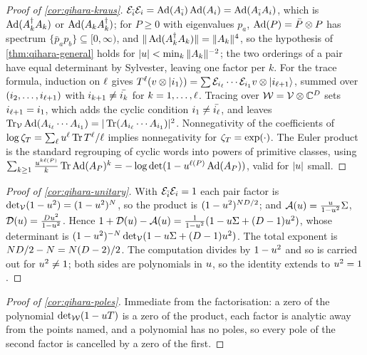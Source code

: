 \begin{proof}[Proof of \cref{cor:qihara-kraus}]
$\mathcal E_{\bar{i}}\mathcal E_{i} = \operatorname{Ad}(A_{\bar{i}})\operatorname{Ad}(A_{i}) = \operatorname{Ad}(A_{\bar{i}}A_{i})$, which is
$\operatorname{Ad}(A_{k}^\dagger A_{k})$ or $\operatorname{Ad}(A_{k}A_{k}^\dagger)$; for $P\ge0$ with eigenvalues $p_a$, $\operatorname{Ad}(P) = \bar
P\otimes P$ has spectrum $\{\bar p_a p_b\}\subseteq[0,\infty)$, and $\|\operatorname{Ad}(A_{k}^\dagger A_{k})\| = \|A_{k}\|^4$, so
the hypothesis of \cref{thm:qihara-general} holds for $|u| < \min_k\|A_{k}\|^{-2}$; the two orderings of a pair have
equal determinant by Sylvester, leaving one factor per $k$. For the trace formula, induction on $\ell$ gives
$T^{\ell}(v\otimes|i_1\rangle) = \sum\mathcal E_{i_{\ell}}\cdots\mathcal E_{i_1}v\otimes|i_{\ell+1}\rangle$, summed over
$(i_2,\dots,i_{\ell+1})$ with $i_{k+1}\ne\bar{i_k}$ for $k = 1,\dots,\ell$. Tracing over
$\mathcal W = \mathcal V\otimes\mathbb C^{D}$ sets $i_{\ell+1} = i_1$, which adds the cyclic condition
$i_1\ne\bar{i_{\ell}}$, and leaves $\operatorname{Tr}_{\mathcal V}\operatorname{Ad}(A_{i_{\ell}}\cdots A_{i_1}) =
|\operatorname{Tr}(A_{i_{\ell}}\cdots A_{i_1})|^2$. Nonnegativity of the coefficients of
$\log\zeta_{T} = \sum_{\ell}u^{\ell}\operatorname{Tr}T^{\ell}/\ell$ implies nonnegativity for $\zeta_{T} = \exp(\cdot)$. The Euler
product is the standard regrouping of cyclic words into powers of primitive classes, using
$\sum_{k\ge1}\frac{u^{k\ell(P)}}{k}\operatorname{Tr}\operatorname{Ad}(A_{P})^k = -\log\det(1-u^{\ell(P)}\operatorname{Ad}(A_{P}))$,
valid for $|u|$ small.
\end{proof}

\begin{proof}[Proof of \cref{cor:qihara-unitary}]
With $\mathcal E_{\bar{i}}\mathcal E_{i} = 1$ each pair factor is $\det\nolimits_{\mathcal V}(1-u^2) = (1-u^2)^N$, so the product is
$(1-u^2)^{ND/2}$; and $\mathcal A(u) = \frac{u}{1-u^2}\Sigma$, $\mathcal D(u) = \frac{Du^2}{1-u^2}$. Hence
$1+\mathcal D(u)-\mathcal A(u) = \frac{1}{1-u^2}(1-u\Sigma+(D-1)u^2)$, whose determinant is
$(1-u^2)^{-N}\det\nolimits_{\mathcal V}(1-u\Sigma+(D-1)u^2)$. The total exponent is $ND/2-N = N(D-2)/2$. The
computation divides by $1-u^2$ and so is carried out for $u^2\ne1$; both sides are polynomials in $u$, so the
identity extends to $u^2 = 1$.
\end{proof}

\begin{proof}[Proof of \cref{cor:qihara-poles}]
Immediate from the factorisation: a zero of the polynomial $\det\nolimits_{\mathcal W}(1-uT)$ is a zero of the product,
each factor is analytic away from the points named, and a polynomial has no poles, so every pole of the second factor
is cancelled by a zero of the first.
\end{proof}

